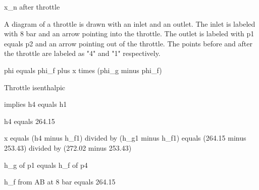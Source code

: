 x_n after throttle

A diagram of a throttle is drawn with an inlet and an outlet. The inlet is labeled with 8 bar and an arrow pointing into the throttle. The outlet is labeled with p1 equals p2 and an arrow pointing out of the throttle. The points before and after the throttle are labeled as "4" and "1" respectively.

phi equals phi_f plus x times (phi_g minus phi_f)

Throttle isenthalpic

implies h4 equals h1

h4 equals 264.15

x equals (h4 minus h_f1) divided by (h_g1 minus h_f1) equals (264.15 minus 253.43) divided by (272.02 minus 253.43)

h_g of p1 equals h_f of p4

h_f from AB at 8 bar equals 264.15